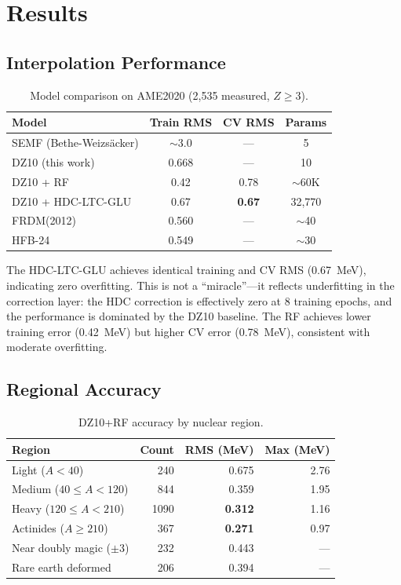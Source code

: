 \documentclass[twocolumn,letterpaper,10pt]{article}
\begin{document}
\section{Results}

\subsection{Interpolation Performance}

\begin{table}[h]
\centering
\caption{Model comparison on AME2020 (2,535 measured, $Z \geq 3$).}
\label{tab:comparison}
\begin{tabular}{lccc}
\toprule
Model & Train RMS & CV RMS & Params \\
\midrule
SEMF (Bethe-Weizs\"acker) & $\sim$3.0 & --- & 5 \\
DZ10 (this work) & 0.668 & --- & 10 \\
DZ10 + RF & 0.42 & 0.78 & $\sim$60K \\
DZ10 + HDC-LTC-GLU & 0.67 & \textbf{0.67} & 32,770 \\
\midrule
FRDM(2012)~\cite{moller2016} & 0.560 & --- & $\sim$40 \\
HFB-24~\cite{goriely2013} & 0.549 & --- & $\sim$30 \\
\bottomrule
\end{tabular}
\end{table}

The HDC-LTC-GLU achieves identical training and CV RMS (0.67~MeV),
indicating zero overfitting. This is not a ``miracle''---it reflects
underfitting in the correction layer: the HDC correction is effectively zero
at 8 training epochs, and the performance is dominated by the DZ10 baseline.
The RF achieves lower training error (0.42~MeV) but higher CV error
(0.78~MeV), consistent with moderate overfitting.

\subsection{Regional Accuracy}

\begin{table}[h]
\centering
\caption{DZ10+RF accuracy by nuclear region.}
\label{tab:regional}
\begin{tabular}{lrrr}
\toprule
Region & Count & RMS (MeV) & Max (MeV) \\
\midrule
Light ($A < 40$) & 240 & 0.675 & 2.76 \\
Medium ($40 \leq A < 120$) & 844 & 0.359 & 1.95 \\
Heavy ($120 \leq A < 210$) & 1090 & \textbf{0.312} & 1.16 \\
Actinides ($A \geq 210$) & 367 & \textbf{0.271} & 0.97 \\
\midrule
Near doubly magic ($\pm 3$) & 232 & 0.443 & --- \\
Rare earth deformed & 206 & 0.394 & --- \\
\bottomrule
\end{tabular}
\end{table}
\end{document}
